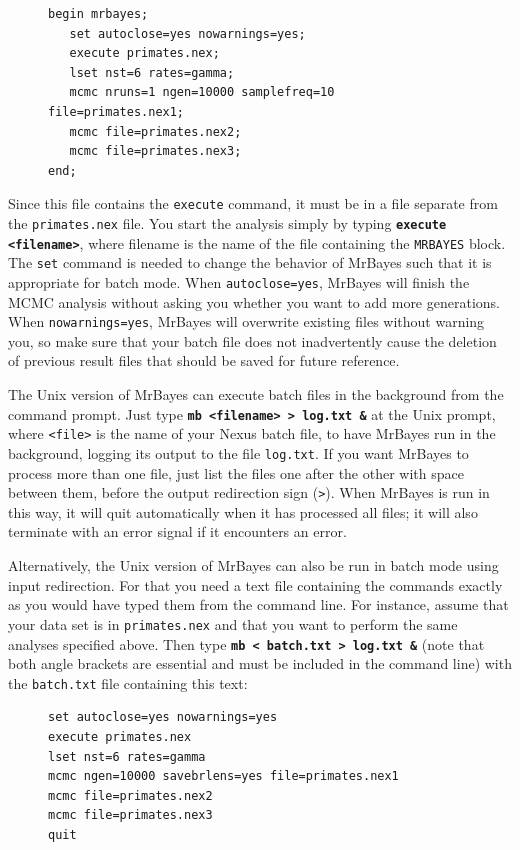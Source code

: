 \documentclass[12pt]{book}
\newcommand{\ttt}[1]{\texttt{#1}}
\newcommand{\tb}[1]{\ttt{\textbf{#1}}}
\begin{document}
\begin{figure}[h]
\centering
\begin{BVerbatim}[fontsize=\small]
begin mrbayes;
   set autoclose=yes nowarnings=yes;
   execute primates.nex;
   lset nst=6 rates=gamma;
   mcmc nruns=1 ngen=10000 samplefreq=10 file=primates.nex1;
   mcmc file=primates.nex2;
   mcmc file=primates.nex3;
end;
\end{BVerbatim}
\end{figure}

Since this file contains the \texttt{execute} command, it must be in a file separate from the
\texttt{primates.nex} file. You start the analysis simply by typing \tb{execute <filename>}, where
filename is the name of the file containing the \texttt{MRBAYES} block. The \texttt{set} command is
needed to change the behavior of MrBayes such that it is appropriate for batch mode. When
\texttt{autoclose=yes}, MrBayes will finish the MCMC analysis without asking you whether you want
to add more generations. When \texttt{nowarnings=yes}, MrBayes will overwrite existing files
without warning you, so make sure that your batch file does not inadvertently cause the deletion of
previous result files that should be saved for future reference.

The Unix version of MrBayes can execute batch files in the background from the command prompt. Just
type \tb{mb <filename> > log.txt \&} at the Unix prompt, where \texttt{<file>} is the name of your
Nexus batch file, to have MrBayes run in the background, logging its output to the file
\texttt{log.txt}. If you want MrBayes to process more than one file, just list the files one after
the other with space between them, before the output redirection sign (\texttt{>}). When MrBayes is
run in this way, it will quit automatically when it has processed all files; it will also terminate
with an error signal if it encounters an error.

Alternatively, the Unix version of MrBayes can also be run in batch mode using input redirection.
For that you need a text file containing the commands exactly as you would have typed them from the
command line. For instance, assume that your data set is in \texttt{primates.nex} and that you want
to perform the same analyses specified above. Then type \tb{mb < batch.txt > log.txt \&} (note that
both angle brackets are essential and must be included in the command line) with the
\texttt{batch.txt} file containing this text:

\begin{figure}[h]
\centering
\begin{BVerbatim}[fontsize=\small]
set autoclose=yes nowarnings=yes
execute primates.nex
lset nst=6 rates=gamma
mcmc ngen=10000 savebrlens=yes file=primates.nex1
mcmc file=primates.nex2
mcmc file=primates.nex3
quit
\end{BVerbatim}
\end{figure}
\end{document}
